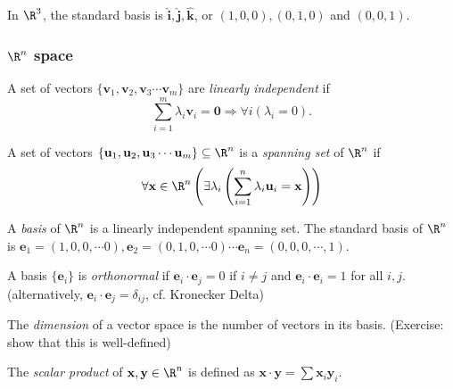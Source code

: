 \documentclass[a4paper]{article}
\begin{document}
In $\R^3$, the standard basis is $\mathbf{\hat{i}, \hat{j}, \hat{k}}$, or $(1, 0, 0), (0, 1, 0)$ and $(0, 0, 1)$.
\subsubsection{\texorpdfstring{$\R^n$}{Rn} space}
\begin{defi}
  A set of vectors $\{\mathbf{v}_1, \mathbf{v}_2, \mathbf{v}_3\cdots \mathbf{v}_m\}$ are \emph{linearly independent} if
  \[
    \sum_{i = 1}^m\lambda_i\mathbf{v}_i = \mathbf{0} \Rightarrow \forall i(\lambda_i = 0).
  \]
\end{defi}
\begin{defi}
  A set of vectors $\{\mathbf{u}_1, \mathbf{u}_2, \mathbf{u}_3\cdots \mathbf{u}_m\}\subseteq \R^n$ is a \emph{spanning set} of $\R^n$ if
  \[
    \forall \mathbf{x} \in \R^n\left(\exists \lambda_i\left(\sum_{i = 1}^n\lambda_i\mathbf{u}_i = \mathbf{x}\right)\right)
  \]
\end{defi}

\begin{defi}
  A \emph{basis} of $\R^n$ is a linearly independent spanning set. The standard basis of $\R^n$ is $\mathbf{e}_1 = (1, 0, 0, \cdots 0), \mathbf{e}_2 = (0, 1, 0, \cdots 0)\cdots \mathbf{e}_n = (0, 0, 0, \cdots, 1)$.
\end{defi}

\begin{defi}
  A basis $\{\mathbf{e}_i\}$ is \emph{orthonormal} if $\mathbf{e}_i\cdot \mathbf{e}_j = 0$ if $i\not= j$ and $\mathbf{e}_i\cdot \mathbf{e}_i = 1$ for all $i, j$. (alternatively, $\mathbf{e}_i\cdot \mathbf{e}_j = \delta_{ij}$, cf. Kronecker Delta)
\end{defi}

\begin{defi}
  The \emph{dimension} of a vector space is the number of vectors in its basis. (Exercise: show that this is well-defined)
\end{defi}
\begin{defi}
  The \emph{scalar product} of $\mathbf{x, y}\in \R^n$ is defined as $\mathbf{x\cdot y} = \sum \mathbf{x}_i\mathbf{y}_i$.
\end{defi}
\end{document}
